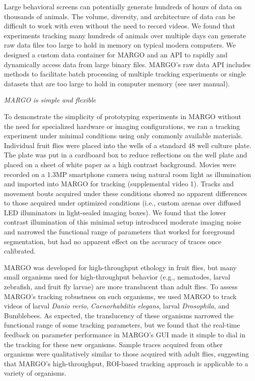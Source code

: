 \documentclass[10pt]{article}
\begin{document}
\begin{multicols}{2}
Large behavioral screens can potentially generate hundreds of hours of data on thousands of animals. The volume, diversity, and architecture of data can be difficult to work with even without the need to record videos. We found that experiments tracking many hundreds of animals over multiple days can generate raw data files too large to hold in memory on typical modern computers. We designed a custom data container for MARGO and an API to rapidly and dynamically access data from large binary files. MARGO's raw data API includes methods to facilitate batch processing of multiple tracking experiments or single datasets that are too large to hold in computer memory (see user manual). 

\textit{MARGO is simple and flexible}

To demonstrate the simplicity of prototyping experiments in MARGO without the need for specialized hardware or imaging configurations, we ran a tracking experiment under minimal conditions using only commonly available materials.  Individual fruit flies were placed into the wells of a standard 48 well culture plate. The plate was put in a cardboard box to reduce reflections on the well plate and placed on a sheet of white paper as a high contrast background. Movies were recorded on a 1.3MP smartphone camera using natural room light as illumination and imported into MARGO for tracking (supplemental video 1). Tracks and movement bouts acquired under these conditions showed no apparent differences to those acquired under optimized conditions (i.e., custom arenas over diffused LED illuminators in light-sealed imaging boxes). We found that the lower contrast illumination of this minimal setup introduced moderate imaging noise and narrowed the functional range of parameters that worked for foreground segmentation, but had no apparent effect on the accuracy of traces once calibrated.

MARGO was developed for high-throughput ethology in fruit flies, but many small organisms used for high-throughput behavior (e.g., nematodes, larval zebrafish, and fruit fly larvae) are more translucent than adult flies. To assess MARGO’s tracking robustness on such organisms, we used MARGO to track videos of larval \emph{Danio rerio}, \emph{Caenorhabditis elegans}, larval \emph{Drosophila}, and Bumblebees. As expected, the translucency of these organisms narrowed the functional range of some tracking parameters, but we found that the real-time feedback on parameter performance in MARGO's GUI made it simple to dial in the tracking for these new organisms. Sample traces acquired from other organisms were qualitatively similar to those acquired with adult flies, suggesting that MARGO’s high-throughput, ROI-based tracking approach is applicable to a variety of organisms.


\end{multicols}
\end{document}
